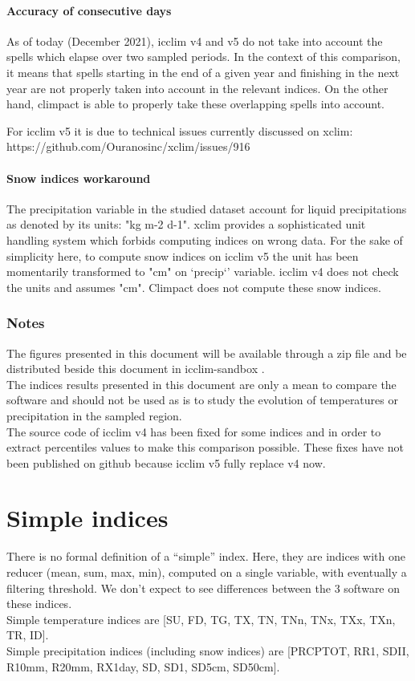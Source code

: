 \documentclass[a4paper,11pt]{article}
\begin{document}
        \subsection{Accuracy of consecutive days}
            As of today (December 2021), icclim v4 and v5 do not take into account the spells which elapse over two sampled periods. In the context of this comparison, it means that spells starting in the end of a given year and finishing in the next year are not properly taken into account in the relevant indices.
            On the other hand, climpact is able to properly take these overlapping spells into account.

            For icclim v5 it is due to technical issues currently discussed on xclim: https://github.com/Ouranosinc/xclim/issues/916

        \subsection{Snow indices workaround}
            The precipitation variable in the studied dataset account for liquid precipitations as denoted by its units: "kg m-2 d-1".
            xclim provides a sophisticated unit handling system which forbids computing indices on wrong data. For the sake of simplicity here, to compute snow indices on icclim v5 the unit has been momentarily transformed to "cm" on `precip`' variable.
            icclim v4 does not check the units and assumes "cm".
            Climpact does not compute these snow indices.
            
    \section{Notes}
        The figures presented in this document will be available through a zip file and be distributed beside this document in icclim-sandbox \cite{gh/icclim_sandbox}.\\
        The indices results presented in this document are only a mean to compare the software and should not be used as is to study the evolution of temperatures or precipitation in the sampled region.\\
        The source code of icclim v4 has been fixed for some indices and in order to extract percentiles values to make this comparison possible. These fixes have not been published on github because icclim v5 fully replace v4 now.


\part{Simple indices}
    There is no formal definition of a “simple” index. Here, they are indices with one reducer (mean, sum, max, min), computed on a single variable, with eventually a filtering threshold. We don't expect to see differences between the 3 software on these indices.\\
    Simple temperature indices are [SU, FD, TG, TX, TN, TNn, TNx, TXx, TXn, TR, ID].\\
    Simple precipitation indices (including snow indices) are [PRCPTOT, RR1, SDII, R10mm, R20mm, RX1day, SD, SD1, SD5cm, SD50cm].\\
\end{document}
